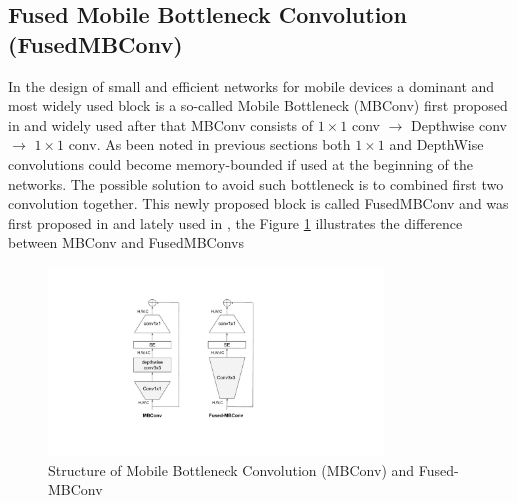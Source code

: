 \subsection{Fused Mobile Bottleneck Convolution (FusedMBConv)}

In the design of small and efficient networks for mobile devices a dominant and most widely used block is a so-called Mobile Bottleneck (MBConv) first proposed in \cite{howard2017_mobilenetv1} and widely used after that \cite{howard2019_searching_mobilenetv3} %
MBConv consists of $1 \times 1$ conv $\rightarrow$ Depthwise conv $\rightarrow$ $1\times 1$ conv. As been noted in previous sections both $1\times 1$ and DepthWise convolutions could become memory-bounded if used at the beginning of the networks. The possible solution to avoid such bottleneck is to combined first two convolution together. This newly proposed block is called FusedMBConv and was first proposed in \cite{li2021_searching} and lately used in \cite{tan2021_efficientnetv2}, the Figure \ref{fig:fusedmbconv} illustrates the difference between MBConv and FusedMBConvs

\begin{figure}[h!]
    \centering
        \includegraphics[clip, height=5cm]{images/fusedmbconv.pdf}
    \caption{Structure of Mobile Bottleneck Convolution (MBConv) and Fused-MBConv}
    \label{fig:fusedmbconv}
    \end{figure}







